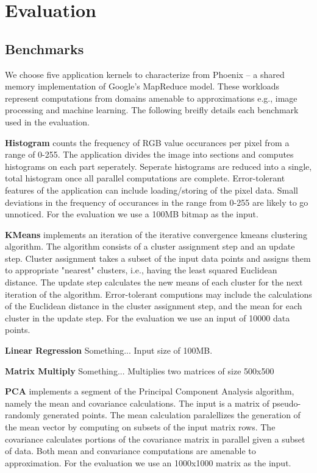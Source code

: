 \section{Evaluation}

\subsection*{Benchmarks}
\label{sec:benchmarks}
We choose five application kernels to characterize from Phoenix -- a shared memory implementation of Google's MapReduce model. These workloads represent computations from domains amenable to approximations e.g., image processing and machine learning. The following breifly details each benchmark used in the evaluation. 

\textbf{Histogram} counts the frequency of RGB value occurances per pixel from a range of 0-255. The application divides the image into sections and computes histograms on each part seperately. Seperate histograms are reduced into a single, total histogram once all parallel computations are complete. Error-tolerant features of the application can include loading/storing of the pixel data. Small deviations in the frequency of occurances in the range from 0-255 are likely to go unnoticed. For the evaluation we use a 100MB bitmap as the input. 

\textbf{KMeans} implements an iteration of the iterative convergence kmeans clustering algorithm. The algorithm consists of a cluster assignment step and an update step. Cluster assignment takes a subset of the input data points and assigns them to appropriate "nearest" clusters, i.e., having the least squared Euclidean distance. The update step calculates the new means of each cluster for the next iteration of the algorithm. Error-tolerant computions may include the calculations of the Euclidean distance in the cluster assignment step, and the mean for each cluster in the update step. For the evaluation we use an input of 10000 data points.

\textbf{Linear Regression} Something... Input size of 100MB.

\textbf{Matrix Multiply} Something... Multiplies two matrices of size 500x500

\textbf{PCA} implements a segment of the Principal Component Analysis algorithm, namely the mean and covariance calculations. The input is a matrix of pseudo-randomly generated points. The mean calculation paralellizes the generation of the mean vector by computing on subsets of the input matrix rows. The covariance calculates portions of the covariance matrix in parallel given a subset of data. Both mean and convariance computations are amenable to approximation. For the evaluation we use an 1000x1000 matrix as the input.


